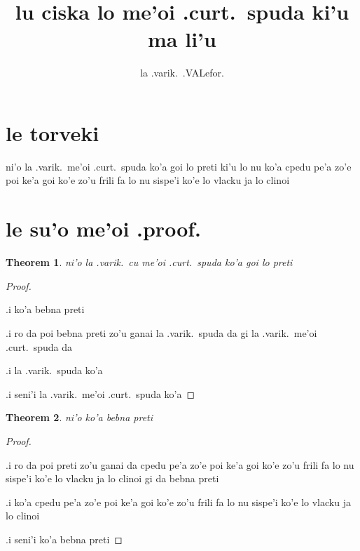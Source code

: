 \documentclass{article}
\title{lu ciska lo me'oi .curt.\ spuda ki'u ma li'u}
\author{la .varik.\ .VALefor.}
\begin{document}
\newtheorem{thm}{Theorem}
\maketitle

\section{le torveki}
ni'o la .varik.\ me'oi .curt.\ spuda ko'a goi lo preti ki'u lo nu ko'a cpedu pe'a zo'e poi ke'a goi ko'e zo'u frili fa lo nu sispe'i ko'e lo vlacku ja lo clinoi

\section{le su'o me'oi .proof.}
\begin{thm}
	ni'o la .varik.\ cu me'oi .curt.\ spuda ko'a goi lo preti
\end{thm}
\begin{proof}
	${}$

	.i ko'a bebna preti

	.i ro da poi bebna preti zo'u ganai la .varik.\ spuda da gi la .varik.\ me'oi .curt.\ spuda da

	.i la .varik.\ spuda ko'a

	.i seni'i la .varik.\ me'oi .curt.\ spuda ko'a
\end{proof}

\begin{thm}
	ni'o ko'a bebna preti
\end{thm}
\begin{proof}
	${}$

	.i ro da poi preti zo'u ganai da cpedu pe'a zo'e poi ke'a goi ko'e zo'u frili fa lo nu sispe'i ko'e lo vlacku ja lo clinoi gi da bebna preti

	.i ko'a cpedu pe'a zo'e poi ke'a goi ko'e zo'u frili fa lo nu sispe'i ko'e lo vlacku ja lo clinoi

	.i seni'i ko'a bebna preti
\end{proof}
\end{document}

